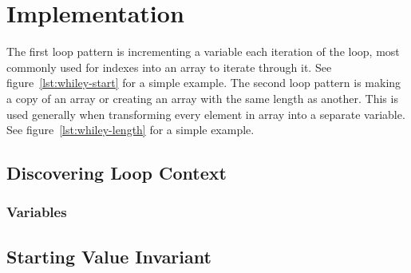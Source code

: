 \chapter{Implementation}\label{C:impl}
%


The first loop pattern is incrementing a variable
each iteration of the loop, most commonly used for indexes into an array to
iterate through it. See figure~\ref{lst:whiley-start} for a simple example.
The second loop pattern is making a copy of an array or creating an array with
the same length as another.
This is used generally when transforming every element in array into a separate
variable. See figure~\ref{lst:whiley-length} for a simple example.

\section{Discovering Loop Context}

\subsection{Variables}



\section{Starting Value Invariant}

